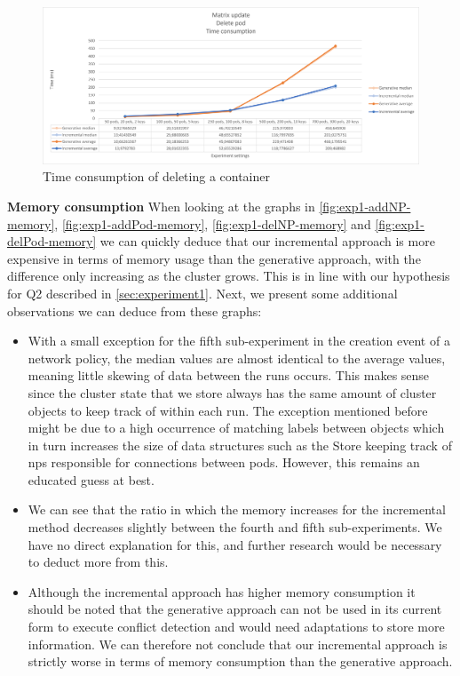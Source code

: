 \begin{figure}[H]
    \centering
    \includegraphics[width=\textwidth]{images/experiment1/delPod-time.png}
    \caption{Time consumption of deleting a container}
    \label{fig:exp1-delPod-time}
\end{figure}



\textbf{Memory consumption}
\newline When looking at the graphs in \autoref{fig:exp1-addNP-memory}, \autoref{fig:exp1-addPod-memory}, \autoref{fig:exp1-delNP-memory}  and \autoref{fig:exp1-delPod-memory} we can quickly deduce that our incremental approach is more expensive in terms of memory usage than the generative approach, with the difference only increasing as the cluster grows. This is in line with our hypothesis for Q2 described in \autoref{sec:experiment1}. Next, we present some additional observations we can deduce from these graphs:
\begin{itemize}
    \item With a small exception for the fifth sub-experiment in the creation event of a network policy, the median values are almost identical to the average values, meaning little skewing of data between the runs occurs. This makes sense since the cluster state that we store always has the same amount of cluster objects to keep track of within each run. The exception mentioned before might be due to a high occurrence of matching labels between objects which in turn increases the size of data structures such as the Store keeping track of \acrshort{np}s responsible for connections between pods. However, this remains an educated guess at best.
    \item We can see that the ratio in which the memory increases for the incremental method decreases slightly between the fourth and fifth sub-experiments. We have no direct explanation for this, and further research would be necessary to deduct more from this. 
 	\item Although the incremental approach has higher memory consumption it should be noted that the generative approach can not be used in its current form to execute conflict detection and would need adaptations to store more information. We can therefore not conclude that our incremental approach is strictly worse in terms of memory consumption than the generative approach.
\end{itemize}

